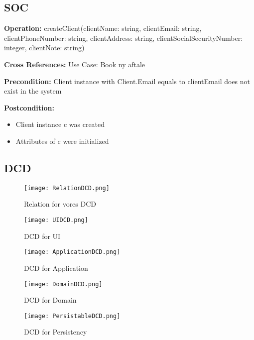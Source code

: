 \subsection{SOC}
\label{bilag:SOCcreateClient}

{\setlength{\parindent}{0cm}
\textbf{Operation:} createClient(clientName: string, clientEmail: string, clientPhoneNumber: string, clientAddress: string, clientSocialSecurityNumber: integer, clientNote: string) 

\textbf{Cross References:} Use Case: Book ny aftale 

\textbf{Precondition:} Client instance with Client.Email equals to clientEmail does not exist in the system

\textbf{Postcondition:}  
		\begin{itemize}
			\item Client instance c was created 
			\item Attributes of c were initialized
		\end{itemize}

\subsection{DCD}
\begin{figure}[H]
    \caption{Relation for vores DCD}
    \centering
        \texttt{[image: RelationDCD.png]}
    \label{bilag:RelationDCD}
\end{figure}

\begin{sidewaysfigure}[p]
    \caption{DCD for UI}
    \centering
        \texttt{[image: UIDCD.png]}
    \label{bilag:UIDCD}
\end{sidewaysfigure}

\begin{sidewaysfigure}[p]
    \caption{DCD for Application}
    \centering
        \texttt{[image: ApplicationDCD.png]}
    \label{bilag:ApplicationDCD}
\end{sidewaysfigure}

\begin{figure}[H]
    \caption{DCD for Domain}
    \centering
        \texttt{[image: DomainDCD.png]}
    \label{bilag:DomainDCD}
\end{figure}

\begin{figure}[h]
    \caption{DCD for Persistency}
    \centering
        \texttt{[image: PersistableDCD.png]}
    \label{bilag:PersistableDCD}
\end{figure}

}
